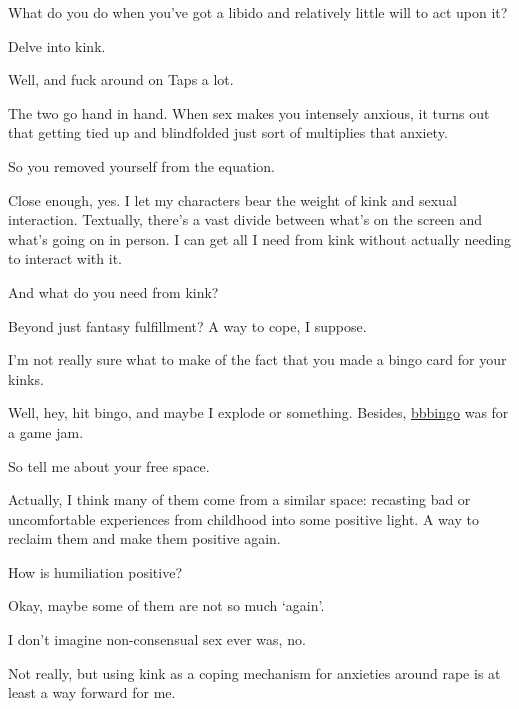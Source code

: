 What do you do when you've got a libido and relatively little will to act upon it?

Delve into kink.

\begin{ally}
Well, and fuck around on Taps a lot.
\end{ally}
The two go hand in hand. When sex makes you intensely anxious, it turns out that getting tied up and blindfolded just sort of multiplies that anxiety.

\begin{ally}
So you removed yourself from the equation.
\end{ally}
Close enough, yes. I let my characters bear the weight of kink and sexual interaction. Textually, there's a vast divide between what's on the screen and what's going on in person. I can get all I need from kink without actually needing to interact with it.

\begin{ally}
And what do you need from kink?
\end{ally}
Beyond just fantasy fulfillment? A way to cope, I suppose.
\newpage


\begin{ally}
I'm not really sure what to make of the fact that you made a bingo card for your kinks.
\end{ally}
Well, hey, hit bingo, and maybe I explode or something. Besides, \href{https://bbbingo.me}{bbbingo} was for a game jam.

\begin{ally}
So tell me about your free space.
\end{ally}
Actually, I think many of them come from a similar space: recasting bad or uncomfortable experiences from childhood into some positive light. A way to reclaim them and make them positive again.

\begin{ally}
How is humiliation positive?
\end{ally}
Okay, maybe some of them are not so much `again'.

\begin{ally}
I don't imagine non-consensual sex ever was, no.
\end{ally}
Not really, but using kink as a coping mechanism for anxieties around rape is at least a way forward for me.


